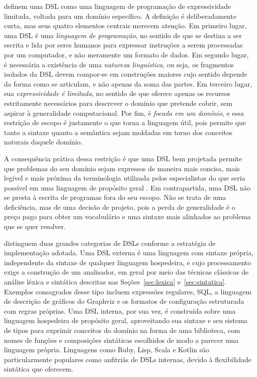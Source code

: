 \documentclass[
    12pt
    ,oneside
    ,a4paper
    ,chapter=TITLE
    ,section=TITLE
    ,sumario=abnt-6027-2012]{abntex2}
\begin{document}
 definem uma DSL como uma linguagem de programação de expressividade
limitada, voltada para um domínio específico. A definição é deliberadamente curta, mas seus
quatro elementos centrais merecem atenção. Em primeiro lugar, uma DSL é uma \textit{linguagem
de programação}, no sentido de que se destina a ser escrita e lida por seres humanos para
expressar instruções a serem processadas por um computador, e não meramente um formato de dados.
Em segundo lugar, é necessária a existência de uma \textit{natureza linguística}, ou seja, os
fragmentos isolados da DSL devem compor-se em construções maiores cujo sentido depende da forma
como se articulam, e não apenas da soma das partes. Em terceiro lugar, sua \textit{expressividade
é limitada}, no sentido de que oferece apenas os recursos estritamente necessários para descrever
o domínio que pretende cobrir, sem aspirar à generalidade computacional. Por fim, é
\textit{focada em um domínio}, e essa restrição de escopo é justamente o que torna a linguagem
útil, pois permite que tanto a sintaxe quanto a semântica sejam moldadas em torno dos conceitos
naturais daquele domínio.

A consequência prática dessa restrição é que uma DSL bem projetada permite que problemas do seu
domínio sejam expressos de maneira mais concisa, mais legível e mais próxima da terminologia
utilizada pelos especialistas do que seria possível em uma linguagem de propósito geral
\cite{fowler2010}. Em contrapartida, uma DSL não se presta à escrita de programas fora do seu
escopo. Não se trata de uma deficiência, mas de uma decisão de projeto, pois a perda de
generalidade é o preço pago para obter um vocabulário e uma sintaxe mais alinhados ao problema
que se quer resolver.

 distinguem duas grandes categorias de DSLs conforme a estratégia de
implementação adotada. Uma DSL externa é uma linguagem com sintaxe própria, independente
da sintaxe de qualquer linguagem hospedeira, e cujo processamento exige a construção de um
analisador, em geral por meio das técnicas clássicas de análise léxica e sintática descritas nas
Seções~\ref{sec:lexica} e~\ref{sec:sintatica}. Exemplos consagrados desse tipo incluem expressões
regulares, SQL, a linguagem de descrição de gráficos do Graphviz e os formatos de configuração
estruturada com regras próprias. Uma DSL interna, por sua vez, é construída sobre uma
linguagem hospedeira de propósito geral, aproveitando sua sintaxe e seu sistema de tipos para
exprimir conceitos do domínio na forma de uma biblioteca, com nomes de funções e composições
sintáticas escolhidos de modo a parecer uma linguagem própria. Linguagens como Ruby, Lisp, Scala
e Kotlin são particularmente populares como anfitriãs de DSLs internas, devido à flexibilidade
sintática que oferecem.
\end{document}
